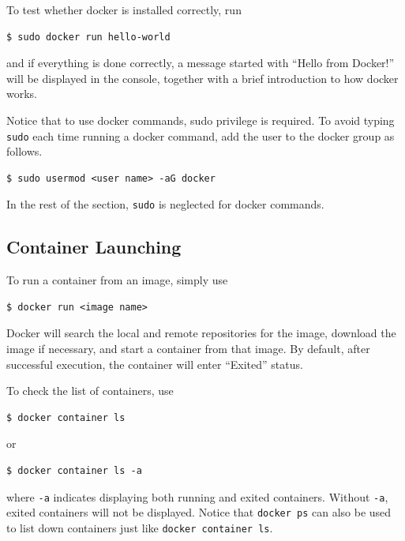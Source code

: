 To test whether docker is installed correctly, run
\begin{lstlisting}
$ sudo docker run hello-world
\end{lstlisting}
and if everything is done correctly, a message started with ``Hello from Docker!'' will be displayed in the console, together with a brief introduction to how docker works.

Notice that to use docker commands, sudo privilege is required. To avoid typing \verb|sudo| each time running a docker command, add the user to the docker group as follows.
\begin{lstlisting}
$ sudo usermod <user name> -aG docker
\end{lstlisting}

In the rest of the section, \verb|sudo| is neglected for docker commands.

\subsection{Container Launching}

To run a container from an image, simply use
\begin{lstlisting}
$ docker run <image name>
\end{lstlisting}
Docker will search the local and remote repositories for the image, download the image if necessary, and start a container from that image. By default, after successful execution, the container will enter ``Exited'' status.

To check the list of containers, use
\begin{lstlisting}
$ docker container ls
\end{lstlisting}
or
\begin{lstlisting}
$ docker container ls -a
\end{lstlisting}
where \verb|-a| indicates displaying both running and exited containers. Without \verb|-a|, exited containers will not be displayed. Notice that \verb|docker ps| can also be used to list down containers just like \verb|docker container ls|.

